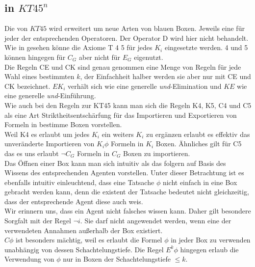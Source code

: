 \subsection{\ND in $KT45^n$}
Die \ND von $KT45$ wird erweitert um neue Arten von blauen Boxen.
Jeweils eine für jeder der entsprechenden Operatoren.
Der Operator D wird hier nicht behandelt.\\
Wie in  gesehen könne die Axiome T 4 5 für jedes $K_i$ eingesetzte werden. 4 und 5 können hingegen für $C_G$ aber nicht für $E_G$ eigenutzt.\\
Die Regeln CE und CK sind genau genommen eine Menge von Regeln für jede Wahl eines bestimmten $k$, der Einfachheit halber werden sie aber nur mit CE und CK bezeichnet.
$EK_i$ verhält sich wie eine generelle \emph{und}-Elimination und $KE$ wie eine generelle \emph{und}-Einführung.\\
Wie auch bei den Regeln zur KT45 kann man sich die Regeln K4, K5, C4 und C5 als eine Art Striktheitsentschärfung für das Importieren und Exportieren von Formeln in bestimme Boxen vorstellen.\\
Weil K4 es erlaubt um jedes $K_i$ ein weiters $K_i$ zu ergänzen erlaubt es effektiv das unveränderte Importieren von $K_i \phi$ Formeln in $K_i$ Boxen.
Ähnliches gilt für C5 das es uns erlaubt $\neg C_G$ Formeln in $C_G$ Boxen zu importieren.\\
Das Öffnen einer Box kann man sich intuitiv als das folgern auf Basis des Wissens des entsprechenden Agenten vorstellen.
Unter dieser Betrachtung ist es ebenfalls intuitiv einleuchtend, dass eine Tatsache $\phi$ nicht einfach in eine Box gebracht werden kann, denn die existent der Tatsache bedeutet nicht gleichzeitig, dass der entsprechende Agent diese auch weis.\\
Wir erinnern uns, dass ein Agent nicht falsches wissen kann.
Daher gilt besondere Sorgfalt mit der Regel $\neg i$.
Sie darf nicht angewendet werden, wenn eine der verwendeten Annahmen außerhalb der Box existiert.\\
$C\phi$ ist besonders mächtig, weil es erlaubt die Formel $\phi$ in jeder Box zu verwenden unabhängig von dessen Schachtelungstiefe.
Die Regel $E^k \phi$ hingegen erlaub die Verwendung von $\phi$ nur in Boxen der Schachtelungstiefe $\leq k$.





